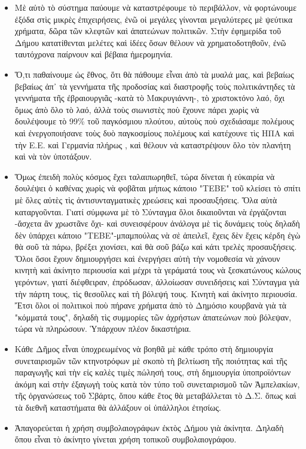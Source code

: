 \documentclass[a4paper]{article}
\begin{document}
\begin{itemize}
\item Μὲ αὐτὸ τὸ σύστημα παύουμε νὰ καταστρέφουμε τὸ περιβάλλον, νὰ φορτώνουμε ἐξόδα στὶς μικρὲς ἐπιχειρήσεις, ἐνῶ οἱ μεγάλες γίνονται μεγαλύτερες μὲ ψεύτικα χρήματα, δῶρα τῶν κλεφτῶν καὶ ἀπατεώνων πολιτικῶν. Στὴν ἐφημερίδα τοῦ Δήμου κατατίθενται μελέτες καὶ ἰδέες ὅσων θέλουν νὰ χρηματοδοτηθοῦν, ἐνῶ ταυτόχρονα παίρνουν καὶ βέβαια ἡμερομηνία.
\item Ὅ,τι παθαίνουμε ὡς ἔθνος, ὅτι θὰ πάθουμε εἶναι ἀπὸ τὰ μυαλά μας, καὶ βεβαίως βεβαίως ἀπ᾿ τὰ γεννήματα τῆς προδοσίας καὶ διαστροφῆς τοὺς πολιτικάντηδες τὰ γεννήματα τῆς ἐβραιουργιᾶς -κατὰ τὸ Μακρυγιάννη-, τὸ χριστοκτόνο λαό, ὄχι ὅμως ἀπὸ ὅλο τὸ λαό, ἀλλὰ τοὺς σιωνιστὲς ποὺ ἔχουνε πάρει χωρὶς νὰ δουλέψουμε τὸ 99\% τοῦ παγκόσμιου πλούτου, αὐτοὺς ποὺ σχεδιάσαμε πολέμους καὶ ἐνεργοποιήσανε τοὺς δυὸ παγκοσμίους πολέμους καὶ κατέχουνε τὶς ΗΠΑ καὶ τὴν Ε.Ε. καὶ Γερμανία πλήρως , καὶ θέλουν νὰ καταστρέψουν ὅλο τὸν πλανήτη καὶ νὰ τὸν ὑποτάξουν.
\item Ὅμως ἐπειδὴ πολὺς κόσμος ἔχει ταλαιπωρηθεῖ, τώρα δίνεται ἡ εὐκαιρία νὰ δουλέψει ὁ καθένας χωρὶς νὰ φοβᾶται μήπως κάποιο "ΤΕΒΕ" τοῦ κλείσει τὸ σπίτι μὲ ὅλες αὐτὲς τὶς ἀντισυνταγματικὲς χρεώσεις καὶ προσαυξήσεις. Ὅλα αὐτὰ καταργοῦνται. Γιατί σύμφωνα μὲ τὸ Σύνταγμα ὅλοι δικαιοῦνται νὰ ἐργάζονται -ἄσχετα ἂν χρωστᾶνε ὄχι- καὶ συνεισφέρουν ἀνάλογα μὲ τὶς δυνάμεις τοὺς δηλαδὴ δὲν ὑπάρχει κάποιο "ΤΕΒΕ"-μπαμπούλας νὰ σὲ ἀπειλεῖ, ἔχεις δὲν ἔχεις κέρδη ἐγὼ θὰ σοῦ τὰ πάρω, βρέξει χιονίσει, καὶ θὰ σοῦ βάζω καὶ κάτι τρελὲς προσαυξήσεις. Ὅλοι ὅσοι ἔχουν δημιουργήσει καὶ ἐνεργήσει αὐτὴ τὴν νομοθεσία νὰ χάνουν κινητὴ καὶ ἀκίνητο περιουσία καὶ μέχρι τὰ γεράματά τους νὰ ξεσκατώνους κώλους γερόντων, γιατί διέφθειραν, ἐπρόδωσαν, ἀλλοίωσαν συνειδήσεις καὶ Σύνταγμα γιὰ τὴν πάρτη τους, τὶς θεσοῦλες καὶ τὴ βόλεψή τους. Κινητὴ καὶ ἀκίνητο περιουσία. Ἔτσι ὅλοι οἱ πολιτικοὶ ποὺ πήρανε χρήματα ἀπὸ τὸ Δημόσιο κουρβανὰ γιὰ τὰ "κόμματά τους", δηλαδὴ τὶς συμμορίες τῶν ἀχρήστων ἀπατεώνων ποὺ βόλεψαν, τώρα νὰ πληρώσουν. Ὑπάρχουν πλέον δικαστήρια.
\item Κάθε Δῆμος εἶναι ὑποχρεωμένος νὰ βοηθᾶ μὲ κάθε τρόπο στὴ δημιουργία συνεταιρισμῶν τῶν κτηνοτρόφων μὲ σκοπὸ τὴ βελτίωση τῆς ποιότητας καὶ τῆς παραγωγῆς καὶ τὴν εἰς καλὲς τιμὲς πώλησή τους, στὴ δημιουργία ὑποπροϊόντων ἀκόμη καὶ στὴν ἐξαγωγὴ τοὺς κατὰ τὸν τύπο τοῦ συνεταιρισμοῦ τῶν Ἀμπελακίων, τῆς ὀργανώσεως τοῦ Σβάρτς, ὅπου κάθε ἔτος θὰ μεταβάλλεται τὸ Δ.Σ. ὅπως καὶ τὰ διεθνῆ καταστήματα θὰ ἀλλάξουν οἱ ὑπάλληλοι ἐτησίως.
\item Ἀπαγορεύεται ἡ χρήση συμβολαιογράφων ἐκτὸς Δήμου γιὰ ἀκίνητα. Δηλαδὴ ὅπου εἶναι τὸ ἀκίνητο γίνεται χρήση τοπικοῦ συμβολαιογράφου.

\end{itemize}
\end{document}
